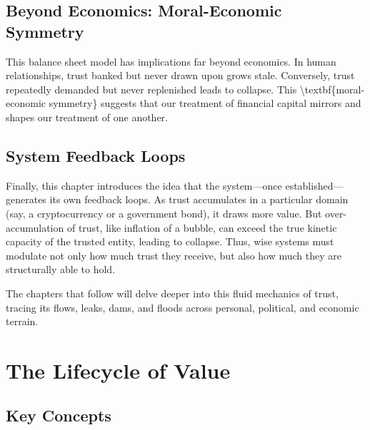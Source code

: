 \documentclass[11pt,oneside]{book}
\begin{document}
\section{Beyond Economics: Moral-Economic Symmetry}

This balance sheet model has implications far beyond economics. In human relationships, trust banked but never drawn upon grows stale. Conversely, trust repeatedly demanded but never replenished leads to collapse. This \textbackslash textbf\{moral-economic symmetry\} suggests that our treatment of financial capital mirrors and shapes our treatment of one another.

\section{System Feedback Loops}

Finally, this chapter introduces the idea that the system—once established—generates its own feedback loops. As trust accumulates in a particular domain (say, a cryptocurrency or a government bond), it draws more value. But over-accumulation of trust, like inflation of a bubble, can exceed the true kinetic capacity of the trusted entity, leading to collapse. Thus, wise systems must modulate not only how much trust they receive, but also how much they are structurally able to hold.

The chapters that follow will delve deeper into this fluid mechanics of trust, tracing its flows, leaks, dams, and floods across personal, political, and economic terrain.


\chapter{ The Lifecycle of Value}

\section{Key Concepts}
\end{document}
